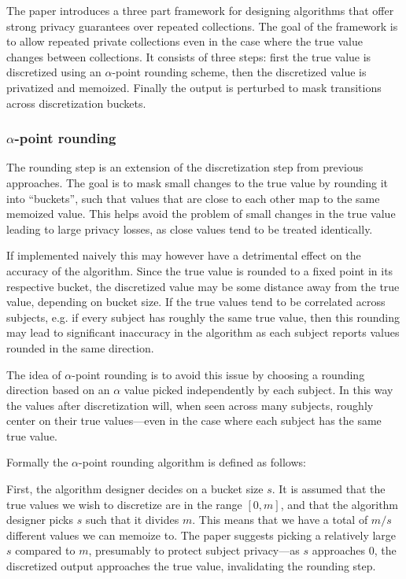 \documentclass[12pt]{article}
\begin{document}
The paper \cite{microsoft_telemetry} introduces a three part framework for designing algorithms that offer strong privacy guarantees over repeated collections. The goal of the framework is to allow repeated private collections even in the case where the true value changes between collections. It consists of three steps: first the true value is discretized using an $\alpha$-point rounding scheme, then the discretized value is privatized and memoized. Finally the output is perturbed to mask transitions across discretization buckets.

\subsubsection{$\alpha$-point rounding \label{sec:alpha_rounding}}

The rounding step is an extension of the discretization step from previous approaches. The goal is to mask small changes to the true value by rounding it into ``buckets'', such that values that are close to each other map to the same memoized value. This helps avoid the problem of small changes in the true value leading to large privacy losses, as close values tend to be treated identically.

If implemented naively this may however have a detrimental effect on the accuracy of the algorithm. Since the true value is rounded to a fixed point in its respective bucket, the discretized value may be some distance away from the true value, depending on bucket size. If the true values tend to be correlated across subjects, e.g. if every subject has roughly the same true value, then this rounding may lead to significant inaccuracy in the algorithm as each subject reports values rounded in the same direction.

The idea of $\alpha$-point rounding is to avoid this issue by choosing a rounding direction based on an $\alpha$ value picked independently by each subject. In this way the values after discretization will, when seen across many subjects, roughly center on their true values---even in the case where each subject has the same true value. \bigskip

Formally the $\alpha$-point rounding algorithm is defined as follows:

First, the algorithm designer decides on a bucket size $s$. It is assumed that the true values we wish to discretize are in the range $[0,m]$, and that the algorithm designer picks $s$ such that it divides $m$. This means that we have a total of $m/s$ different values we can memoize to. The paper suggests picking a relatively large $s$ compared to $m$, presumably to protect subject privacy---as $s$ approaches 0, the discretized output approaches the true value, invalidating the rounding step.
\end{document}
